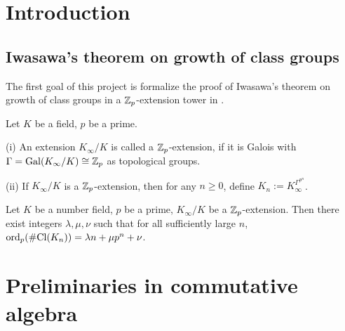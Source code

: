 %

\tableofcontents

\section{Introduction}

\subsection{Iwasawa's theorem on growth of class groups}

The first goal of this project is formalize the proof of
Iwasawa's theorem on growth of class groups in a ${\mathbb {Z}}_p$-extension tower
in {\Lean}.

\begin{definition}
\label{Zp-ext-def}
Let $K$ be a field, $p$ be a prime.

{\rm(i)} An extension $K_\infty/K$ is called a ${\mathbb {Z}}_p$-extension,
if it is Galois with $\Gamma={\mathrm{Gal}}(K_\infty/K)\cong{\mathbb {Z}}_p$
as topological groups.

{\rm(ii)} If $K_\infty/K$ is a ${\mathbb {Z}}_p$-extension, then for any
$n\geq 0$, define $K_n:=K_\infty^{\Gamma^{p^n}}$.
\end{definition}

\begin{thm}
\label{clgp-growth}
Let $K$ be a number field, $p$ be a prime,
$K_\infty/K$ be a ${\mathbb {Z}}_p$-extension.
Then there exist integers $\lambda,\mu,\nu$
such that for all sufficiently large $n$,
$\operatorname{ord}_p(\#{\mathrm{Cl}}(K_n))=\lambda n+\mu p^n+\nu$.
\end{thm}

\section{Preliminaries in commutative algebra}

